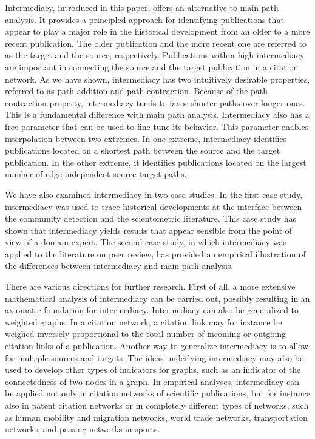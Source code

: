 \documentclass[9pt,twocolumn,twoside]{pnas-alt} %
\theoremstyle{definition}
\begin{document}
Intermediacy, introduced in this paper, offers an alternative to main path analysis. It provides a principled approach for identifying publications that appear to play a major role in the historical development from an older to a more recent publication. The older publication and the more recent one are referred to as the target and the source, respectively. Publications with a high intermediacy are important in connecting the source and the target publication in a citation network. As we have shown, intermediacy has two intuitively desirable properties, referred to as path addition and path contraction. Because of the path contraction property, intermediacy tends to favor shorter paths over longer ones. This is a fundamental difference with main path analysis. Intermediacy also has a free parameter that can be used to fine-tune its behavior. This parameter enables interpolation between two extremes. In one extreme, intermediacy identifies publications located on a shortest path between the source and the target publication. In the other extreme, it identifies publications located on the largest number of edge independent source-target paths.

We have also examined intermediacy in two case studies. In the first case study, intermediacy was used to trace historical developments at the interface between the community detection and the scientometric literature. This case study has shown that intermediacy yields results that appear sensible from the point of view of a domain expert. The second case study, in which intermediacy was applied to the literature on peer review, has provided an empirical illustration of the differences between intermediacy and main path analysis.

There are various directions for further research. First of all, a more extensive mathematical analysis of intermediacy can be carried out, possibly resulting in an axiomatic foundation for intermediacy. Intermediacy can also be generalized to weighted graphs. In a citation network, a citation link may for instance be weighed inversely proportional to the total number of incoming or outgoing citation links of a publication. Another way to generalize intermediacy is to allow for multiple sources and targets. The ideas underlying intermediacy may also be used to develop other types of indicators for graphs, such as an indicator of the connectedness of two nodes in a graph. In empirical analyses, intermediacy can be applied not only in citation networks of scientific publications, but for instance also in patent citation networks or in completely different types of networks, such as human mobility and migration networks, world trade networks, transportation networks, and passing networks in sports.
\end{document}
